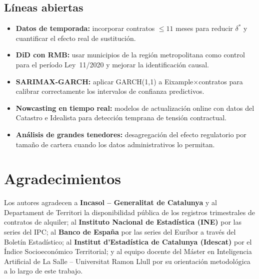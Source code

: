 \documentclass[10pt,a4paper,twocolumn]{article}
\begin{document}
\subsection{Líneas abiertas}

\begin{itemize}[leftmargin=*, itemsep=2pt]
  \item \textbf{Datos de temporada:} incorporar contratos $\leq 11$ meses para
    reducir $\delta^*$ y cuantificar el efecto real de sustitución.
  \item \textbf{DiD con RMB:} usar municipios de la región metropolitana como control
    para el período Ley~11/2020 y mejorar la identificación causal.
  \item \textbf{SARIMAX-GARCH:} aplicar GARCH(1,1) a Eixample$\times$contratos para
    calibrar correctamente los intervalos de confianza predictivos.
  \item \textbf{Nowcasting en tiempo real:} modelos de actualización online con datos
    del Catastro e Idealista para detección temprana de tensión contractual.
  \item \textbf{Análisis de grandes tenedores:} desagregación del efecto regulatorio
    por tamaño de cartera cuando los datos administrativos lo permitan.
\end{itemize}

\section*{Agradecimientos}

Los autores agradecen a \textbf{Incasol -- Generalitat de Catalunya} y al
Departament de Territori la disponibilidad pública de los registros trimestrales
de contratos de alquiler; al \textbf{Instituto Nacional de Estadística (INE)}
por las series del IPC; al \textbf{Banco de España} por las series del Euríbor
a través del Boletín Estadístico; al \textbf{Institut d'Estadística de Catalunya
(Idescat)} por el Índice Socioeconómico Territorial; y al equipo docente del
Máster en Inteligencia Artificial de La Salle -- Universitat Ramon Llull por su
orientación metodológica a lo largo de este trabajo.
\end{document}
